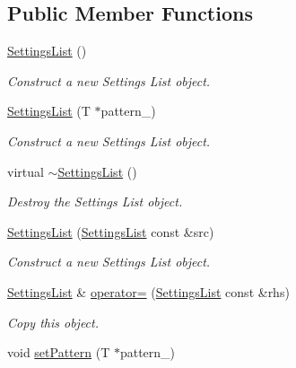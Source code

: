 \subsection*{Public Member Functions}
\begin{DoxyCompactItemize}
\item 
\mbox{\label{class_settings_list_ae3807f3a712ceec429d4e318acc0e7f7}} 
\hyperlink{class_settings_list_ae3807f3a712ceec429d4e318acc0e7f7}{Settings\+List} ()
\begin{DoxyCompactList}\small\item\em Construct a new Settings List object. \end{DoxyCompactList}\item 
\hyperlink{class_settings_list_a9ea36eb5d00258d66eac568c9ddc134a}{Settings\+List} (T $\ast$pattern\+\_\+)
\begin{DoxyCompactList}\small\item\em Construct a new Settings List object. \end{DoxyCompactList}\item 
\mbox{\label{class_settings_list_ae4b6326d9b80ae8976b9a2fffd2fe867}} 
virtual \hyperlink{class_settings_list_ae4b6326d9b80ae8976b9a2fffd2fe867}{$\sim$\+Settings\+List} ()
\begin{DoxyCompactList}\small\item\em Destroy the Settings List object. \end{DoxyCompactList}\item 
\hyperlink{class_settings_list_a6481d0b54c16db6368fe32f60a81dfeb}{Settings\+List} (\hyperlink{class_settings_list}{Settings\+List} const \&src)
\begin{DoxyCompactList}\small\item\em Construct a new Settings List object. \end{DoxyCompactList}\item 
\hyperlink{class_settings_list}{Settings\+List} \& \hyperlink{class_settings_list_aed522696851838b46c6b539f38e24d44}{operator=} (\hyperlink{class_settings_list}{Settings\+List} const \&rhs)
\begin{DoxyCompactList}\small\item\em Copy this object. \end{DoxyCompactList}\item 
void \hyperlink{class_settings_list_a351b4d9b96ecbf7778d1b2593f0bc0a3}{set\+Pattern} (T $\ast$pattern\+\_\+)

\end{DoxyCompactItemize}
